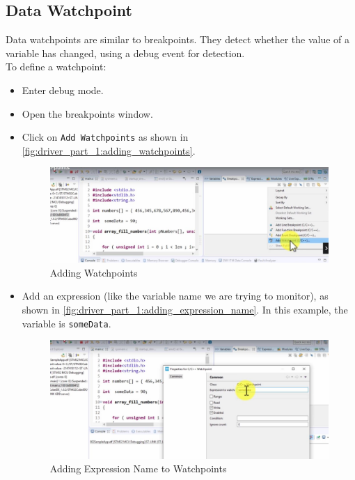 \newpage
\subsection{Data Watchpoint}

Data watchpoints are similar to breakpoints. They detect whether the value of a variable has changed, using a debug event for detection.\\

To define a watchpoint:

\begin{itemize}
    \item Enter debug mode.

    \item Open the breakpoints window.

    \item Click on \verb|Add Watchpoints| as shown in \autoref{fig:driver_part_1:adding_watchpoints}.

\begin{figure}[h]
\centering
\includegraphics[scale=0.5]{Figures/driver_part_1/adding_watchpoints}
\caption{Adding Watchpoints}
\label{fig:driver_part_1:adding_watchpoints}
\end{figure} 
    
\item Add an expression (like the variable name we are trying to monitor), as shown in \autoref{fig:driver_part_1:adding_expression_name}. In this example, the variable is \verb|someData|.


\begin{figure}[h]
\centering
\includegraphics[scale=0.5]{Figures/driver_part_1/adding_expression_name}
\caption{Adding Expression Name to Watchpoints}
\label{fig:driver_part_1:adding_expression_name}
\end{figure} 


\end{itemize}

